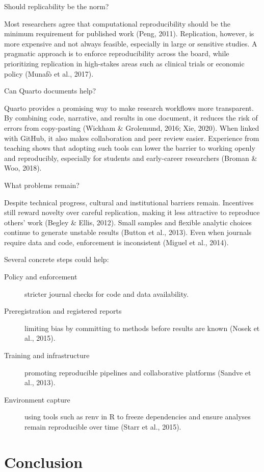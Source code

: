 \documentclass[
  a4paper,
]{article}
\begin{document}
Should replicability be the norm?

Most researchers agree that computational reproducibility should be the
minimum requirement for published work (Peng, 2011). Replication,
however, is more expensive and not always feasible, especially in large
or sensitive studies. A pragmatic approach is to enforce reproducibility
across the board, while prioritizing replication in high-stakes areas
such as clinical trials or economic policy (Munafò et al., 2017).

Can Quarto documents help?

Quarto provides a promising way to make research workflows more
transparent. By combining code, narrative, and results in one document,
it reduces the risk of errors from copy-pasting (Wickham \& Grolemund,
2016; Xie, 2020). When linked with GitHub, it also makes collaboration
and peer review easier. Experience from teaching shows that adopting
such tools can lower the barrier to working openly and reproducibly,
especially for students and early-career researchers (Broman \& Woo,
2018).

What problems remain?

Despite technical progress, cultural and institutional barriers remain.
Incentives still reward novelty over careful replication, making it less
attractive to reproduce others' work (Begley \& Ellis, 2012). Small
samples and flexible analytic choices continue to generate unstable
results (Button et al., 2013). Even when journals require data and code,
enforcement is inconsistent (Miguel et al., 2014).

Several concrete steps could help:

\begin{description}
\item[Policy and enforcement]
stricter journal checks for code and data availability.
\item[Preregistration and registered reports]
limiting bias by committing to methods before results are known (Nosek
et al., 2015).
\item[Training and infrastructure]
promoting reproducible pipelines and collaborative platforms (Sandve et
al., 2013).
\item[Environment capture]
using tools such as renv in R to freeze dependencies and ensure analyses
remain reproducible over time (Starr et al., 2015).
\end{description}

\section{Conclusion}\label{conclusion}
\end{document}
